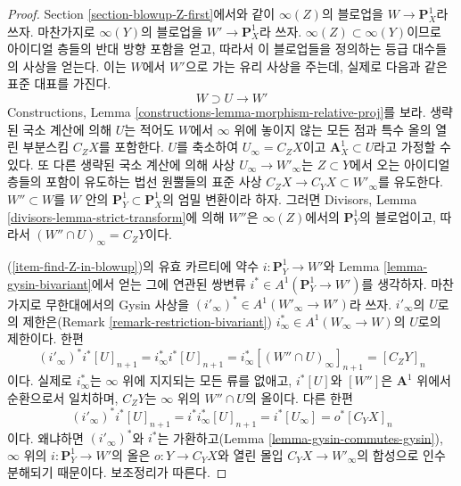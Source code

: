 \begin{proof}
Section \ref{section-blowup-Z-first}에서와 같이 $\infty(Z)$의 블로업을
$W \to \mathbf{P}^1_X$라 쓰자. 마찬가지로 $\infty(Y)$의 블로업을
$W' \to \mathbf{P}^1_X$라 쓰자. $\infty(Z) \subset \infty(Y)$이므로
아이디얼 층들의 반대 방향 포함을 얻고, 따라서 이 블로업들을 정의하는
등급 대수들의 사상을 얻는다. 이는 $W$에서 $W'$으로 가는 유리 사상을
주는데, 실제로 다음과 같은 표준 대표를 가진다.
$$
W \supset U \longrightarrow W'
$$
Constructions, Lemma
\ref{constructions-lemma-morphism-relative-proj}를 보라. 생략된 국소
계산에 의해 $U$는 적어도 $W$에서 $\infty$ 위에 놓이지 않는 모든
점과 특수 올의 열린 부분스킴 $C_Z X$를 포함한다. $U$를 축소하여
$U_\infty = C_Z X$이고 $\mathbf{A}^1_X \subset U$라고 가정할 수 있다.
또 다른 생략된 국소 계산에 의해 사상 $U_\infty \to W'_\infty$는
$Z \subset Y$에서 오는 아이디얼 층들의 포함이 유도하는 법선
원뿔들의 표준 사상 $C_Z X \to C_Y X \subset W'_\infty$를 유도한다.
$W'' \subset W$를 $W$ 안의
$\mathbf{P}^1_Y \subset \mathbf{P}^1_X$의 엄밀 변환이라 하자. 그러면
Divisors, Lemma \ref{divisors-lemma-strict-transform}에 의해 $W''$은
$\infty(Z)$에서의 $\mathbf{P}^1_Y$의 블로업이고, 따라서
$(W'' \cap U)_\infty = C_ZY$이다.

\medskip\noindent
(\ref{item-find-Z-in-blowup})의 유효 카르티에 약수
$i : \mathbf{P}^1_Y \to W'$와 Lemma \ref{lemma-gysin-bivariant}에서 얻는
그에 연관된 쌍변류 $i^* \in A^1(\mathbf{P}^1_Y \to W')$를 생각하자.
마찬가지로 무한대에서의 Gysin 사상을
$(i'_\infty)^* \in A^1(W'_\infty \to W')$라 쓰자. $i'_\infty$의
$U$로의 제한은(Remark \ref{remark-restriction-bivariant})
$i_\infty^* \in A^1(W_\infty \to W)$의 $U$로의 제한이다. 한편
$$
(i'_\infty)^* i^* [U]_{n + 1} =
i_\infty^* i^* [U]_{n + 1} =
i_\infty^* [(W'' \cap U)_\infty]_{n + 1} =
[C_ZY]_n
$$
이다. 실제로 $i_\infty^*$는 $\infty$ 위에 지지되는 모든 류를
없애고, $i^*[U]$와 $[W'']$은 $\mathbf{A}^1$ 위에서 순환으로서
일치하며, $C_ZY$는 $\infty$ 위의 $W'' \cap U$의 올이다. 다른 한편
$$
(i'_\infty)^* i^* [U]_{n + 1} =
i^* i_\infty^*[U]_{n + 1} =
i^* [U_\infty] =
o^*[C_YX]_n
$$
이다. 왜냐하면 $(i'_\infty)^*$와 $i^*$는 가환하고(Lemma
\ref{lemma-gysin-commutes-gysin}), $\infty$ 위의
$i : \mathbf{P}^1_Y \to W'$의 올은 $o : Y \to C_YX$와 열린 몰입
$C_YX \to W'_\infty$의 합성으로 인수분해되기 때문이다.
보조정리가 따른다.
\end{proof}

